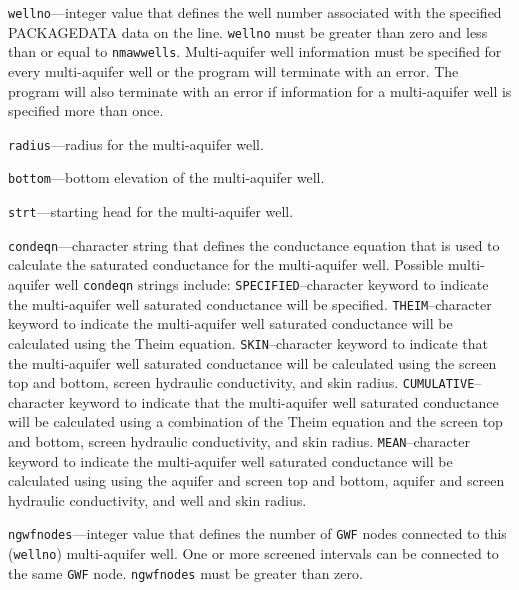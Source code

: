 \begin{description}
\item \texttt{wellno}---integer value that defines the well number associated with the specified PACKAGEDATA data on the line. \texttt{wellno} must be greater than zero and less than or equal to \texttt{nmawwells}. Multi-aquifer well information must be specified for every multi-aquifer well or the program will terminate with an error.  The program will also terminate with an error if information for a multi-aquifer well is specified more than once.

\item \texttt{radius}---radius for the multi-aquifer well.

\item \texttt{bottom}---bottom elevation of the multi-aquifer well.

\item \texttt{strt}---starting head for the multi-aquifer well.

\item \texttt{condeqn}---character string that defines the conductance equation that is used to calculate the saturated conductance for the multi-aquifer well. Possible multi-aquifer well \texttt{condeqn} strings include: \texttt{SPECIFIED}--character keyword to indicate the multi-aquifer well saturated conductance will be specified.  \texttt{THEIM}--character keyword to indicate the multi-aquifer well saturated conductance will be calculated using the Theim equation.  \texttt{SKIN}--character keyword to indicate that the multi-aquifer well saturated conductance will be calculated using the screen top and bottom, screen hydraulic conductivity, and skin radius.    \texttt{CUMULATIVE}--character keyword to indicate that the multi-aquifer well saturated conductance will be calculated using a combination of the Theim equation and the screen top and bottom, screen hydraulic conductivity, and skin radius.  \texttt{MEAN}--character keyword to indicate the multi-aquifer well saturated conductance will be calculated using using the aquifer and screen top and bottom, aquifer and screen hydraulic conductivity, and well and skin radius.

\item \texttt{ngwfnodes}---integer value that defines the number of \texttt{GWF} nodes connected to this (\texttt{wellno}) multi-aquifer well. One or more screened intervals can be connected to the same \texttt{GWF} node. \texttt{ngwfnodes} must be greater than zero.


\end{description}
